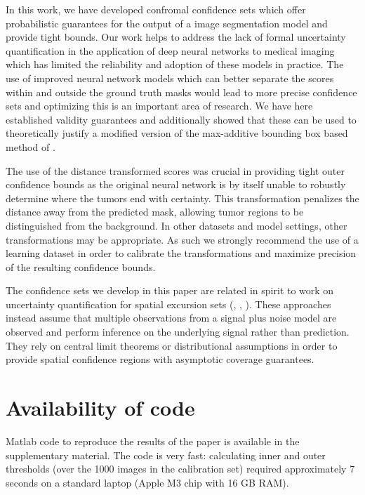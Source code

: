 In this work, we have developed confromal confidence sets which offer probabilistic guarantees for the output of a image segmentation model and provide tight bounds. Our work helps to address the lack of formal uncertainty quantification in the application of deep neural networks to medical imaging which has limited the reliability and adoption of these models in practice. The use of improved neural network models which can better separate the scores within and outside the ground truth masks would lead to more precise confidence sets and optimizing this is an important area of research. We have here established validity guarantees and additionally showed that these can be used to theoretically justify a modified version of the max-additive bounding box based method of \cite{Andeol2023}. 

The use of the distance transformed scores was crucial in providing tight outer confidence bounds as the original neural network is by itself unable to robustly determine where the tumors end with certainty.  This transformation penalizes the distance away from the predicted mask, allowing tumor regions to be distinguished from the background. In other datasets and model settings, other transformations may be appropriate. As such we strongly recommend the use of a learning dataset in order to calibrate the transformations and maximize precision of the resulting confidence bounds.

The confidence sets we develop in this paper are related in spirit to work on uncertainty quantification for spatial excursion sets (\cite{Bowring2019}, \cite{Mejia2020}, \cite{chen2017density}). These approaches instead assume that multiple observations from a signal plus noise model are observed and perform inference on the underlying signal rather than prediction. They rely on central limit theorems or distributional assumptions in order to provide spatial confidence regions with asymptotic coverage guarantees. 

\section*{Availability of code}
\vspace{-0.1cm}
Matlab code to reproduce the results of the paper is available in the supplementary material. The code is very fast: calculating inner and outer thresholds (over the 1000 images in the calibration set) required approximately 7 seconds on a standard laptop (Apple M3 chip with 16 GB RAM).